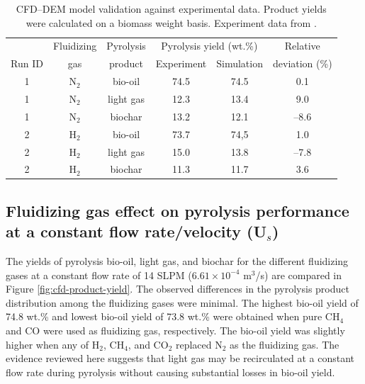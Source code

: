 \documentclass{article}
\begin{document}
\begin{table}[H]
    \centering
    \caption{CFD–DEM model validation against experimental data. Product yields were calculated on a biomass weight basis. Experiment data from \cite{French-2021}.}
    \label{tab:cfddem-validation}
    \begin{tabular}{cccccc}
        \toprule
               & Fluidizing   & Pyrolysis & \multicolumn{2}{c}{Pyrolysis yield (wt.\%)} & Relative \\
        Run ID & gas          & product   & Experiment & Simulation                     & deviation (\%) \\
        \midrule
        1 & N$_2$ & bio-oil   & 74.5      & 74.5       & 0.1     \\
        1 & N$_2$ & light gas & 12.3      & 13.4       & 9.0     \\
        1 & N$_2$ & biochar   & 13.2      & 12.1       & --8.6   \\
        2 & H$_2$ & bio-oil   & 73.7      & 74,5       & 1.0     \\
        2 & H$_2$ & light gas & 15.0      & 13.8       & --7.8   \\
        2 & H$_2$ & biochar   & 11.3      & 11.7       & 3.6     \\
        \bottomrule
    \end{tabular}
\end{table}

\subsection{Fluidizing gas effect on pyrolysis performance at a constant flow rate/velocity (U\texorpdfstring{$_s$}{s})}

The yields of pyrolysis bio-oil, light gas, and biochar for the different fluidizing gases at a constant flow rate of 14 SLPM ($6.61\times10^{-4}$ m$^3$/s) are compared in Figure \ref{fig:cfd-product-yield}. The observed differences in the pyrolysis product distribution among the fluidizing gases were minimal. The highest bio-oil yield of 74.8 wt.\% and lowest bio-oil yield of 73.8 wt.\% were obtained when pure CH$_4$ and CO were used as fluidizing gas, respectively. The bio-oil yield was slightly higher when any of H$_2$, CH$_4$, and CO$_2$ replaced N$_2$ as the fluidizing gas. The evidence reviewed here suggests that light gas may be recirculated at a constant flow rate during pyrolysis without causing substantial losses in bio-oil yield.
\end{document}
